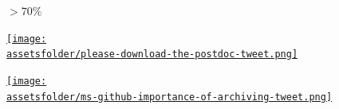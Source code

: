 \documentclass{beamer}
\newcommand{\assetsfolder}{./assets}
\begin{document}
    \begin{frame}
        \begin{center}
            \Large
        \end{center}

    \end{frame}

    \begin{frame}
        \begin{center}
            \fontsize{60}{70}\selectfont \(> 70\%\)
        \end{center}


    \end{frame}

    \begin{frame}
        \begin{center}
            \href{https://twitter.com/ianholmes/status/288689712636493824?lang=en}{\texttt{[image: \\assetsfolder/please-download-the-postdoc-tweet.png]}}
        \end{center}

    \end{frame}

    \begin{frame}
        \begin{center}
            \href{https://twitter.com/betatim/status/1004077975233552385}{\texttt{[image: \\assetsfolder/ms-github-importance-of-archiving-tweet.png]}}
        \end{center}
    \end{frame}
\end{document}
